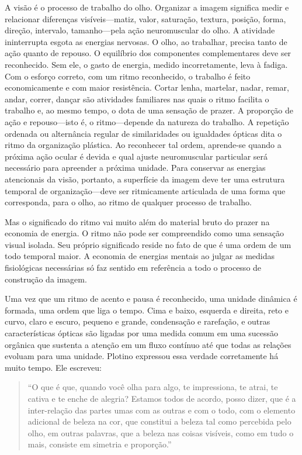 \documentclass[a4paper]{article}
\begin{document}
A visão é o processo de trabalho do olho. Organizar a imagem significa medir e relacionar diferenças visíveis---matiz, valor, saturação, textura, posição, forma, direção, intervalo, tamanho---pela ação neuromuscular do olho. A atividade ininterrupta esgota as energias nervosas. O olho, ao trabalhar, precisa tanto de ação quanto de repouso. O equilíbrio dos componentes complementares deve ser reconhecido. Sem ele, o gasto de energia, medido incorretamente, leva à fadiga. Com o esforço correto, com um ritmo reconhecido, o trabalho é feito economicamente e com maior resistência. Cortar lenha, martelar, nadar, remar, andar, correr, dançar são atividades familiares nas quais o ritmo facilita o trabalho e, ao mesmo tempo, o dota de uma sensação de prazer. A proporção de ação e repouso---isto é, o ritmo---depende da natureza do trabalho. A repetição ordenada ou alternância regular de similaridades ou igualdades ópticas dita o ritmo da organização plástica. Ao reconhecer tal ordem, aprende-se quando a próxima ação ocular é devida e qual ajuste neuromuscular particular será necessário para apreender a próxima unidade. Para conservar as energias atencionais da visão, portanto, a superfície da imagem deve ter uma estrutura temporal de organização---deve ser ritmicamente articulada de uma forma que corresponda, para o olho, ao ritmo de qualquer processo de trabalho.

Mas o significado do ritmo vai muito além do material bruto do prazer na economia de energia. O ritmo não pode ser compreendido como uma sensação visual isolada. Seu próprio significado reside no fato de que é uma ordem de um todo temporal maior. A economia de energias mentais ao julgar as medidas fisiológicas necessárias só faz sentido em referência a todo o processo de construção da imagem.

Uma vez que um ritmo de acento e pausa é reconhecido, uma unidade dinâmica é formada, uma ordem que liga o tempo. Cima e baixo, esquerda e direita, reto e curvo, claro e escuro, pequeno e grande, condensação e rarefação, e outras características ópticas são ligadas por uma medida comum em uma sucessão orgânica que sustenta a atenção em um fluxo contínuo até que todas as relações evoluam para uma unidade. Plotino expressou essa verdade corretamente há muito tempo. Ele escreveu:

\begin{quote}
``O que é que, quando você olha para algo, te impressiona, te atrai, te cativa e te enche de alegria? Estamos todos de acordo, posso dizer, que é a inter-relação das partes umas com as outras e com o todo, com o elemento adicional de beleza na cor, que constitui a beleza tal como percebida pelo olho, em outras palavras, que a beleza nas coisas visíveis, como em tudo o mais, consiste em simetria e proporção.''
\end{quote}
\end{document}
